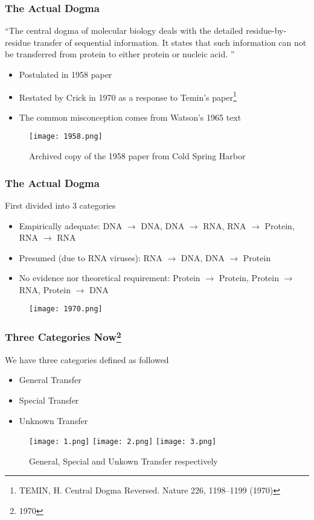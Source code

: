 \documentclass{beamer}
\begin{document}
\begin{frame}[fragile]
\frametitle{The Actual Dogma}
\begin{exampleblock}{}
    {\large ``The central dogma of molecular biology deals with the detailed
    residue-by-residue transfer of sequential information. It states
    that such information can not be transferred from protein to either
    protein or nucleic acid. ''}
    \vskip5mm
    \hspace*{}\footnotemark[1]\
\end{exampleblock}
\begin{itemize}
    \item Postulated in 1958 paper
    \item Restated by Crick in 1970 as a response to Temin's paper\footnote[2]{TEMIN, H. Central Dogma Reversed. Nature 226, 1198–1199 (1970)}
    \item The common misconception comes from Watson's 1965 text
\end{itemize}
\end{frame}
\begin{frame}[fragile]
\begin{figure}
\centering
\texttt{[image: 1958.png]}
\caption{Archived copy of the 1958 paper from Cold Spring Harbor}
\end{figure}
\end{frame}
\begin{frame}
\frametitle{The Actual Dogma}
First divided into 3 categories 
\begin{itemize}
    \item Empirically adequate: DNA $\rightarrow$ DNA, DNA $\rightarrow$ RNA, RNA $\rightarrow$ Protein, RNA $\rightarrow$ RNA
    \item Presumed (due to RNA viruses): RNA $\rightarrow$ DNA, DNA $\rightarrow$ Protein
    \item No evidence nor theoretical requirement: Protein $\rightarrow$ Protein, Protein $\rightarrow$ RNA, Protein $\rightarrow$ DNA 
\end{itemize}
\begin{figure}
\texttt{[image: 1970.png]}
\end{figure}
\end{frame}
\begin{frame}[fragile]
\frametitle{Three Categories Now\footnote{1970}}
We have three categories defined as followed
\begin{itemize}
    \item General Transfer 
    \item Special Transfer
    \item Unknown Transfer
\end{itemize}
\begin{figure}
\texttt{[image: 1.png]}
\texttt{[image: 2.png]}
\texttt{[image: 3.png]}
\caption{General, Special and Unkown Transfer respectively}
    
\end{figure}

\end{frame}
\end{document}
